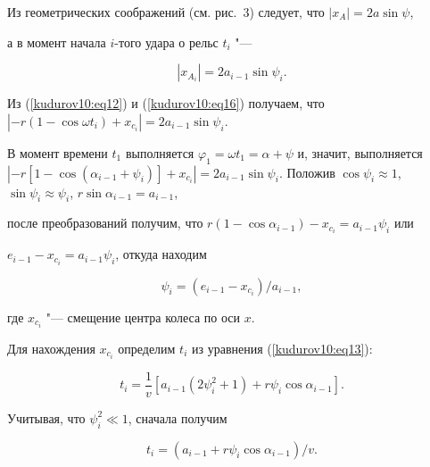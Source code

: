 Из геометрических соображений (см. рис.~3) следует, что $ | x_A  |=2 a \sin \psi$,

а в момент начала $i$-того удара о рельс $t_i$ "---

\begin{equation}

\label{kudurov10:eq16}

| x_{A_i} |=2a_{i-1} \sin \psi_i.

\end{equation}

Из (\ref{kudurov10:eq12}) и (\ref{kudurov10:eq16}) получаем, что $\left| -r\left( 1 - \cos \omega t_i \right) + x_{c_i}

\right|=2a_{i-1} \sin \psi_i$.



В момент времени $t_1$ выполняется $\varphi_1 =\omega t_1 =\alpha +\psi$ и, значит, выполняется $\left|

-r\left[ 1-\cos \left( \alpha_{i-1} + \psi_i \right) \right] + x_{c_i}

 \right|=2a_{i-1} \sin \psi_i$. Положив $\cos \psi_i \approx 1$, $\sin\psi_i \approx \psi_i$, $r \sin \alpha _{i-1} =a_{i-1}$,

после преобразований получим, что $r\left( 1-\cos \alpha_{i-1} \right) - x_{c_i} =a_{i-1} \psi_i $ или

$e_{i-1} - x_{c_i} = a_{i-1} \psi _i$, откуда находим

\begin{equation}

\label{kudurov10:eq17}

\psi_i =({e_{i-1} - x_{c_i}})/{a_{i-1}},

\end{equation}

где $x_{c_i}$ "--- смещение центра колеса по оси $x$.



Для нахождения $x_{c_i}$ определим $t_i$ из уравнения (\ref{kudurov10:eq13}): 

$$

t_i = \frac{1}{v }\left[ a_{i-1} \left( 2\psi_i^2 +1 \right) + r\psi

_i \cos \alpha_{i-1} \right].

$$

Учитывая, что $\psi_i^2 \ll 1$, сначала получим

\begin{equation}

\label{kudurov10:eq18}

t_i =({a_{i-1} + r \psi_i \cos \alpha_{i-1} })/{v}.

\end{equation}


